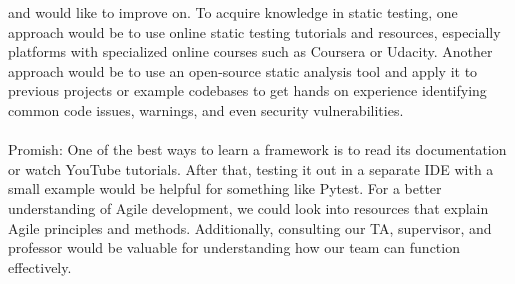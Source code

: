 \documentclass[12pt, titlepage]{article}
\begin{document}
\begin{enumerate}
  and would like to improve on. To acquire knowledge in static testing, one approach would be to use online static 
  testing tutorials and resources, especially platforms with specialized online courses such as Coursera or Udacity. 
  Another approach would be to use an open-source static analysis tool and apply it to previous projects or example 
  codebases to get hands on experience identifying common code issues, warnings, and even security vulnerabilities.\\\\
  \hspace{2em} Promish: One of the best ways to learn a framework is to read its 
  documentation or watch YouTube tutorials. After that, testing it out in a separate IDE 
  with a small example would be helpful for something like Pytest. For a better 
  understanding of Agile development, we could look into resources that explain Agile 
  principles and methods. Additionally, consulting our TA, supervisor, and professor 
  would be valuable for understanding how our team can function effectively.\\\\

\end{enumerate}
\end{document}
